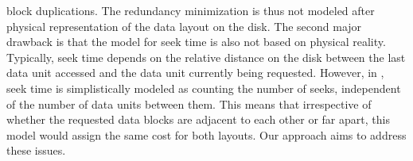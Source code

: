 block duplications. The redundancy minimization is thus not modeled after
physical representation of the data layout on the disk. The second major
drawback is that the model for seek time is also not based on physical reality.
Typically, seek time depends on the relative distance on the disk between the
last data unit accessed and the data unit currently being requested. However,
in \cite{optimizingredundancy}, seek time is simplistically modeled as counting the number of
seeks, independent of the number of data units between them. This means
that irrespective of whether the requested data blocks are adjacent to each other or far apart, this model would assign the same cost for both layouts. Our approach
aims to address these issues. 

